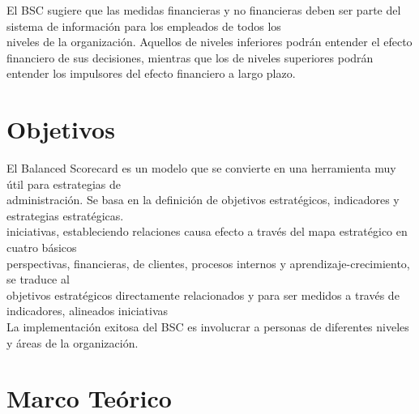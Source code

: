 \documentclass[%
 reprint,
 amsmath,amssymb,
 aps,
]{revtex4-1}
\begin{document}
El BSC sugiere que las medidas financieras y no financieras deben ser parte del sistema de información para los empleados de todos los\\
niveles de la organización. Aquellos de niveles inferiores podrán entender el efecto financiero de sus decisiones, mientras que los de niveles superiores podrán\\
entender los impulsores del efecto financiero a largo plazo.\\


\section {Objetivos}

El Balanced Scorecard es un modelo que se convierte en una herramienta muy útil para estrategias de\\
administración. Se basa en la definición de objetivos estratégicos, indicadores y estrategias estratégicas.\\
iniciativas, estableciendo relaciones causa efecto a través del mapa estratégico en cuatro básicos\\
perspectivas, financieras, de clientes, procesos internos y aprendizaje-crecimiento, se traduce al\\
objetivos estratégicos directamente relacionados y para ser medidos a través de indicadores, alineados iniciativas\\
La implementación exitosa del BSC es involucrar a personas de diferentes niveles y áreas de la organización.\\	

\section {Marco Teórico}
\end{document}
